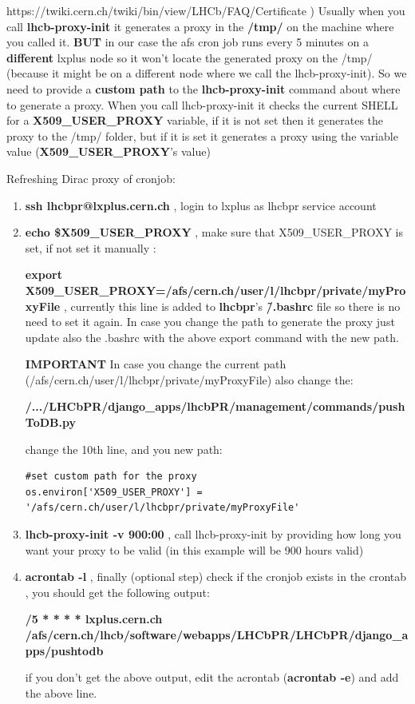 \documentclass{lhcbnote}
\begin{document}
https://twiki.cern.ch/twiki/bin/view/LHCb/FAQ/Certificate )
Usually when you call {\bf lhcb-proxy-init} it generates a proxy in the {\bf /tmp/} on the machine where you called it. {\bf BUT} in our case the afs cron job runs every 5 minutes 
on a {\bf different} lxplus node so it won't locate the generated proxy on the /tmp/ (because it might be on a different node where we call the lhcb-proxy-init). 
So we need to provide a {\bf custom path} to the {\bf lhcb-proxy-init} command about where to generate a proxy. When you call lhcb-proxy-init it checks the current SHELL for a 
{\bf X509\_USER\_PROXY} variable, if it is not set then it generates the proxy to the /tmp/ folder, but if it is set it generates a proxy using the variable value ({\bf X509\_USER\_PROXY}'s value)

\vspace {4mm}

Refreshing Dirac proxy of cronjob:

\vspace {2mm}
\begin {enumerate}
\item
{\bf ssh lhcbpr@lxplus.cern.ch} , login to lxplus as lhcbpr service account
\item
{\bf echo \$X509\_USER\_PROXY} , make sure that X509\_USER\_PROXY is set, if not set it manually :

{\bf export X509\_USER\_PROXY=/afs/cern.ch/user/l/lhcbpr/private/myProxyFile} , currently this line is added to {\bf lhcbpr}'s {\bf \~/.bashrc} file so there is no need to set it again. 
In case you change the path to generate the proxy just update also the .bashrc with the above export command with the new path. 

{\bf IMPORTANT} In case you change the current path (/afs/cern.ch/user/l/lhcbpr/private/myProxyFile) also change the:

{\bf /.../LHCbPR/django\_apps/lhcbPR/management/commands/pushToDB.py}

change the 10th line, and you new path:
\begin{verbatim}
#set custom path for the proxy
os.environ['X509_USER_PROXY'] = '/afs/cern.ch/user/l/lhcbpr/private/myProxyFile'
\end{verbatim}

\item
{\bf lhcb-proxy-init -v 900:00} , call lhcb-proxy-init by providing how long you want your proxy to be valid (in this example will be 900 hours valid)
\item
{\bf acrontab -l} , finally (optional step) check if the cronjob exists in the crontab , you should get the following output:

{\bf */5 * * * * lxplus.cern.ch /afs/cern.ch/lhcb/software/webapps/LHCbPR/LHCbPR/django\_apps/pushtodb}

if you don't get the above output, edit the acrontab ({\bf acrontab -e}) and add the above line.
\end {enumerate}
\end{document}
